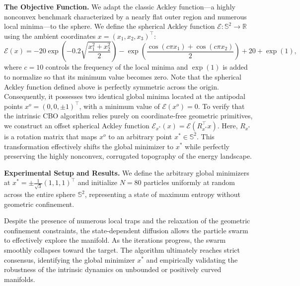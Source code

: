 \documentclass[11pt]{amsart}
\newcommand{\p}{o}%
\begin{document}
\textbf{The Objective Function.}
We adapt the classic Ackley function—a highly nonconvex benchmark characterized by a nearly flat outer region and numerous local minima—to the sphere. We define the spherical Ackley function $\mathcal{E}: \mathbb{S}^2 \to \mathbb{R}$ using the ambient coordinates $x = (x_1, x_2, x_3)^\top$:
\begin{equation*}
    \mathcal{E}(x) = -20 \exp\left( -0.2 \sqrt{\frac{x_1^2 + x_2^2}{2}} \right) - \exp\left( \frac{\cos(c \pi x_1) + \cos(c \pi x_2)}{2} \right) + 20 + \exp(1),
\end{equation*}
where $c = 10$ controls the frequency of the local minima and $\exp(1)$ is added to normalize so that its minimum value becomes zero. Note that the spherical Ackley function defined above is perfectly symmetric across the origin. Consequently, it possesses two identical global minima located at the antipodal points $x^o = (0, 0, \pm 1)^\top$, with a minimum value of $\mathcal{E}(x^o) = 0$. To verify that the intrinsic CBO algorithm relies purely on coordinate-free geometric primitives, we construct an offset spherical Ackley function $\mathcal{E}_{x^*}(x) = \mathcal{E}(R_{x^*}^\top x)$. Here, $R_{x^*}$ is a rotation matrix that maps $x^o$ to an arbitrary point $x^* \in \mathbb{S}^2$. This transformation effectively shifts the global minimizer to $x^*$ while perfectly preserving the highly nonconvex, corrugated topography of the energy landscape. 




\textbf{Experimental Setup and Results.}
We define the arbitrary global minimizers at $x^* =\pm  \frac{1}{\sqrt{3}}(1, 1, 1)^\top$ and initialize $N = 80$ particles uniformly at random across the entire sphere $\mathbb{S}^2$, representing a state of maximum entropy without geometric confinement.

Despite the presence of numerous local traps and the relaxation of the geometric confinement constraints, the state-dependent diffusion allows the particle swarm to effectively explore the manifold. As the iterations progress, the swarm smoothly collapses toward the target. The algorithm ultimately reaches strict consensus, identifying the global minimizer $x^*$  and empirically validating the robustness of the intrinsic dynamics on unbounded or positively curved manifolds. 
\end{document}
